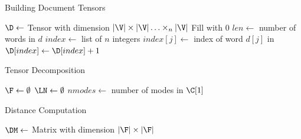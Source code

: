 \documentclass[handout]{beamer}
\begin{document}
\begin{frame}{Building Document Tensors}
  \small
\begin{algorithm}[H]
  \caption{Build Tensor}
  \label{alg:BuildTensor}
    
  
  \Output{\D}
  \BlankLine
  $\D \leftarrow $ Tensor with dimension $|\V| \times |\V| \ldots
  \times_n |\V|$\;
  Fill \D with 0\;
  $len \leftarrow$ number of words in $d$\;
   {
    $index \leftarrow$ list of $n$ integers\;
     {
      $index[j] \leftarrow$ index of word $d[j]$ in \V\;
    }
    $\D[index] \leftarrow \D[index] + 1$\;
  }
  \Return{\D}
\end{algorithm}
\end{frame}


\begin{frame}{Tensor Decomposition}
  \tiny
  \begin{algorithm}[H]
  \label{alg:ExtractFactors}
  \caption{Extract Factors}
    
   
  \Output{\LN, \F}
  \BlankLine
  $\F \leftarrow \emptyset$\;
  $\LN \leftarrow \emptyset$\;
  $nmodes \leftarrow$ number of modes in $\C[1]$\;
  \Return{\LN, \F}
\end{algorithm}
\end{frame}


\begin{frame}{Distance Computation}
\begin{algorithm}[H]
  \caption{Build Distance Matrix}
  \label{alg:distance}
   
  \Input{\F}
  \Output{\DM}
  \BlankLine
  $\DM \leftarrow $ Matrix with dimension $|\F| \times |\F|$\;
  \Return{\DM}
\end{algorithm}
\end{frame}
\end{document}

